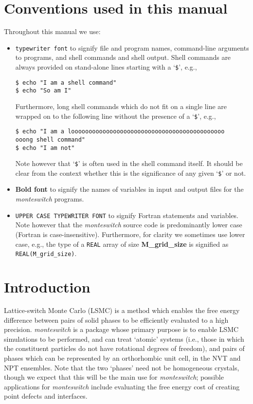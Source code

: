 \documentclass{report}
\begin{document}
\chapter*{Conventions used in this manual}
Throughout this manual we use:
\begin{itemize}
\item \texttt{typewriter font} to signify file and program names, command-line arguments to programs, and shell
commands and shell output. Shell commands are always provided on stand-alone lines starting with a `\verb|$|', e.g.,
\begin{verbatim}
$ echo "I am a shell command"
$ echo "So am I"
\end{verbatim}
Furthermore, long shell commands which do not fit on a single line are wrapped on to the following line without the presence of
a `\verb|$|', e.g.,
\begin{verbatim}
$ echo "I am a loooooooooooooooooooooooooooooooooooooooooooo
ooong shell command"
$ echo "I am not"
\end{verbatim}
Note however that `\verb|$|' is often used in the shell command itself. It should be clear from the context whether this is the
significance of any given `\verb|$|' or not.
\item \textbf{Bold font} to signify the names of variables in input and output files for the \emph{monteswitch} programs.
\item \texttt{UPPER CASE TYPEWRITER FONT} to signify Fortran statements and variables. Note however that the \emph{monteswitch} 
source code is predominantly lower case (Fortran is case-insensitive). Furthermore, for clarity we sometimes use lower case, e.g.,
the type of a \texttt{REAL} array of size \textbf{M\_grid\_size} is signified as \texttt{REAL(M\_grid\_size)}.
\end{itemize}


\chapter{Introduction}
Lattice-switch Monte Carlo (LSMC) \cite{Bruce_1997,Bruce_2000} is a method which enables the free energy difference between pairs of solid
phases to be efficiently evaluated to a high precision.
%
\emph{monteswitch} is a package whose primary purpose is to enable LSMC simulations to be performed, and can treat 
`atomic' systems (i.e., those in which the constituent particles do not have rotational degrees of 
freedom), and pairs of phases which can be represented by an orthorhombic unit cell, in the NVT and NPT ensembles.
Note that the two `phases' need not be homogeneous crystals, though we expect that this will be the main use for \emph{monteswitch}; 
possible applications for \emph{monteswitch} include evaluating the free energy cost of creating
point defects and interfaces.
\end{document}
